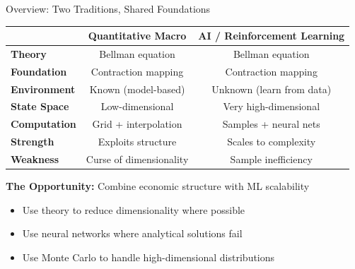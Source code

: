 \documentclass[10pt,english,aspectratio=169]{beamer}
\begin{document}
\begin{frame}{Overview: Two Traditions, Shared Foundations}
\begin{center}
\renewcommand{\arraystretch}{1.3}
\begin{tabular}{|l|c|c|}
\hline
 & \textbf{Quantitative Macro} & \textbf{AI / Reinforcement Learning} \\
\hline
\textbf{Theory} & Bellman equation & Bellman equation \\
\textbf{Foundation} & Contraction mapping & Contraction mapping \\
\hline
\textbf{Environment} & Known (model-based) & Unknown (learn from data) \\
\textbf{State Space} & Low-dimensional & Very high-dimensional \\
\textbf{Computation} & Grid + interpolation & Samples + neural nets \\
\hline
\textbf{Strength} & Exploits structure & Scales to complexity \\
\textbf{Weakness} & Curse of dimensionality & Sample inefficiency \\
\hline
\end{tabular}
\end{center}

\bigskip
\textbf{The Opportunity:} Combine economic structure with ML scalability
\begin{itemize}
    \item Use theory to reduce dimensionality where possible
    \item Use neural networks where analytical solutions fail
    \item Use Monte Carlo to handle high-dimensional distributions
\end{itemize}
\end{frame}

\end{document}

